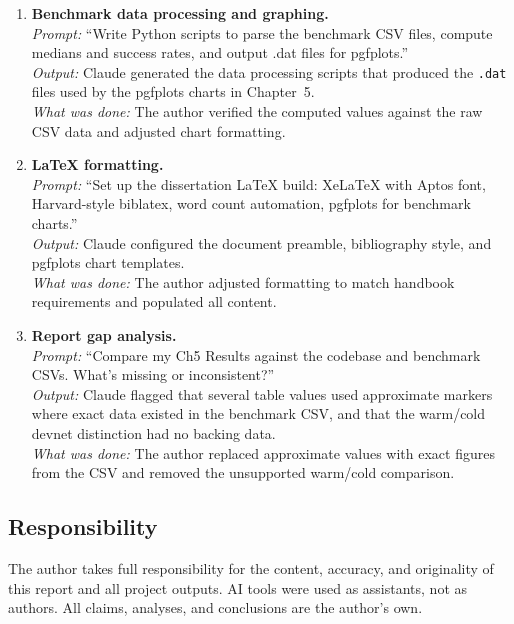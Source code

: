\begin{enumerate}
  \item \textbf{Benchmark data processing and graphing.}\\
    \textit{Prompt:} ``Write Python scripts to parse the benchmark CSV
    files, compute medians and success rates, and output .dat files for
    pgfplots.''\\
    \textit{Output:} Claude generated the data processing scripts that
    produced the \texttt{.dat} files used by the pgfplots charts in
    Chapter~5.\\
    \textit{What was done:} The author verified the computed values
    against the raw CSV data and adjusted chart formatting.

  \item \textbf{LaTeX formatting.}\\
    \textit{Prompt:} ``Set up the dissertation LaTeX build: XeLaTeX with
    Aptos font, Harvard-style biblatex, word count automation, pgfplots
    for benchmark charts.''\\
    \textit{Output:} Claude configured the document preamble, bibliography
    style, and pgfplots chart templates.\\
    \textit{What was done:} The author adjusted formatting to match
    handbook requirements and populated all content.

  \item \textbf{Report gap analysis.}\\
    \textit{Prompt:} ``Compare my Ch5 Results against the codebase and
    benchmark CSVs.  What's missing or inconsistent?''\\
    \textit{Output:} Claude flagged that several table values used
    approximate markers where exact data existed in the benchmark CSV,
    and that the warm/cold devnet distinction had no backing data.\\
    \textit{What was done:} The author replaced approximate values with
    exact figures from the CSV and removed the unsupported warm/cold
    comparison.
\end{enumerate}

\subsection*{Responsibility}

The author takes full responsibility for the content, accuracy, and
originality of this report and all project outputs.  AI tools were used as
assistants, not as authors.  All claims, analyses, and conclusions are the
author's own.

